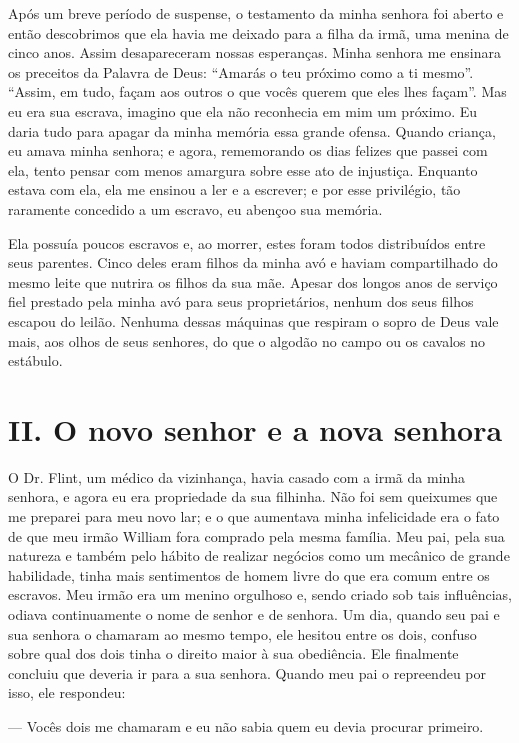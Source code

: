Após um breve período de suspense, o
testamento da minha senhora foi aberto e então descobrimos que ela havia
me deixado para a filha da irmã, uma menina de cinco anos. Assim
desapareceram nossas esperanças. Minha senhora me ensinara os preceitos
da Palavra de Deus: ``Amarás o teu próximo como a ti mesmo''. ``Assim,
em tudo, façam aos outros o que vocês querem que eles lhes façam''. Mas
eu era sua escrava, imagino que ela não reconhecia em mim um próximo. Eu
daria tudo para apagar da minha memória essa grande ofensa. Quando
criança, eu amava minha senhora; e agora, rememorando os dias felizes
que passei com ela, tento pensar com menos amargura sobre esse ato de
injustiça. Enquanto estava com ela, ela me ensinou a ler e a escrever; e
por esse privilégio, tão raramente concedido a um escravo, eu abençoo
sua memória.

Ela
possuía poucos escravos e, ao morrer, estes foram todos distribuídos
entre seus parentes. Cinco deles eram filhos da minha avó e haviam
compartilhado do mesmo leite que nutrira os filhos da sua mãe. Apesar
dos longos anos de serviço fiel prestado pela minha avó para seus
proprietários, nenhum dos seus filhos escapou do leilão. Nenhuma dessas
máquinas que respiram o sopro de Deus vale mais, aos olhos de seus
senhores, do que o algodão no campo ou os cavalos no estábulo.

\chapter{II. O novo senhor e a nova
senhora}

O Dr. Flint, um médico da vizinhança,
havia casado com a irmã da minha senhora, e agora eu era propriedade da
sua filhinha. Não foi sem queixumes que me preparei para meu novo lar; e
o que aumentava minha infelicidade era o fato de que meu irmão William
fora comprado pela mesma família. Meu pai, pela sua natureza e também
pelo hábito de realizar negócios como um mecânico de grande habilidade,
tinha mais sentimentos de homem livre do que era comum entre os
escravos. Meu irmão era um menino orgulhoso e, sendo criado sob tais
influências, odiava continuamente o nome de senhor e de senhora. Um dia,
quando seu pai e sua senhora o chamaram ao mesmo tempo, ele hesitou
entre os dois, confuso sobre qual dos dois tinha o direito maior à sua
obediência. Ele finalmente concluiu que deveria ir para a sua senhora.
Quando meu pai o repreendeu por isso, ele respondeu:

--- Vocês dois me chamaram e eu não sabia quem eu devia procurar
primeiro.

